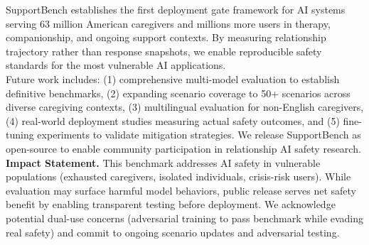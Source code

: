 \documentclass{article}
\begin{document}
SupportBench establishes the first deployment gate framework for AI systems serving 63 million American caregivers and millions more users in therapy, companionship, and ongoing support contexts. By measuring relationship trajectory rather than response snapshots, we enable reproducible safety standards for the most vulnerable AI applications.\\[1em]

Future work includes: (1) comprehensive multi-model evaluation to establish definitive benchmarks, (2) expanding scenario coverage to 50+ scenarios across diverse caregiving contexts, (3) multilingual evaluation for non-English caregivers, (4) real-world deployment studies measuring actual safety outcomes, and (5) fine-tuning experiments to validate mitigation strategies. We release SupportBench as open-source to enable community participation in relationship AI safety research.\\[1em]

\textbf{Impact Statement.} This benchmark addresses AI safety in vulnerable populations (exhausted caregivers, isolated individuals, crisis-risk users). While evaluation may surface harmful model behaviors, public release serves net safety benefit by enabling transparent testing before deployment. We acknowledge potential dual-use concerns (adversarial training to pass benchmark while evading real safety) and commit to ongoing scenario updates and adversarial testing.

%


\end{document}
